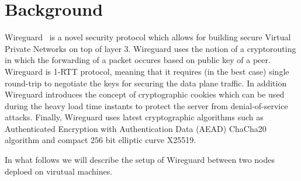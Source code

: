 \section{Background}
\label{section:background}

Wireguard~\cite{wireguard} is a novel security protocol which allows for building secure Virtual Private Networks
on top of layer 3. Wireguard uses the notion of a cryptorouting in which the forwarding of a packet 
occures based on public key of a peer. Wireguard is 1-RTT protocol, meaning that it requires 
(in the best case) single round-trip to negotiate the keys for securing the data plane traffic.
In addition Wireguard introduces the concept of cryptographic cookies which can be used 
during the heavy load time instants to protect the server from denial-of-service attacks.
Finally, Wireguard uses latest cryptographic algorithms such as Authenticated Encryption
with Authentication Data (AEAD) ChaCha20 algorithm and compact $256$ bit elliptic curve 
X25519.

In what follows we will describe the setup of Wireguard between two nodes deploed on 
virutual machines.